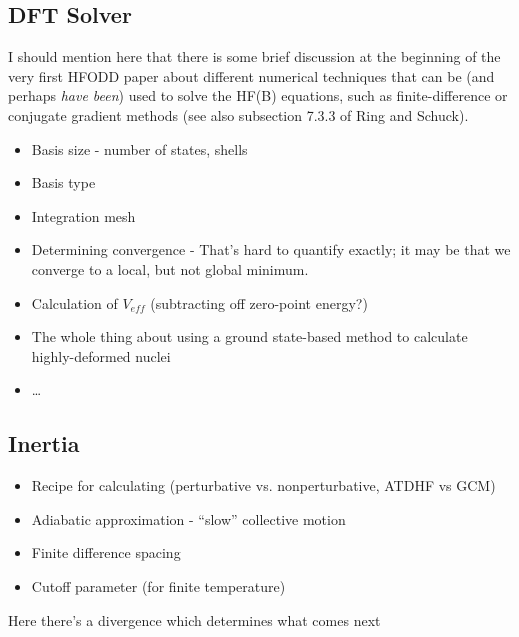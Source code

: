 \subsection{DFT Solver}
I should mention here that there is some brief discussion at the beginning of the very first HFODD paper about different numerical techniques that can be (and perhaps \textit{have been}) used to solve the HF(B) equations, such as finite-difference or conjugate gradient methods (see also subsection 7.3.3 of Ring and Schuck).

\begin{itemize}
\item Basis size - number of states, shells
\item Basis type
\item Integration mesh
\item Determining convergence - That's hard to quantify exactly; it may be that we converge to a local, but not global minimum.
\item Calculation of $V_{eff}$ (subtracting off zero-point energy?)
\item The whole thing about using a ground state-based method to calculate highly-deformed nuclei
\item \dots
\end{itemize}

\subsection{Inertia}
\begin{itemize}
\item Recipe for calculating (perturbative vs. nonperturbative, ATDHF vs GCM)
\item Adiabatic approximation - ``slow'' collective motion
\item Finite difference spacing
\item Cutoff parameter (for finite temperature)
\end{itemize}

Here there's a divergence which determines what comes next

